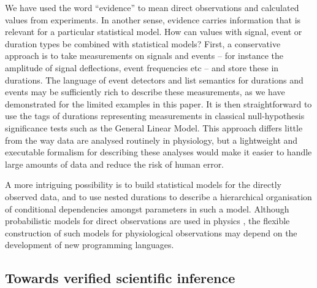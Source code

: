 We have used the word ``evidence'' to mean direct observations and
calculated values from experiments. In another sense, evidence carries
information that is relevant for a particular statistical model. How
can values with signal, event or duration types be combined with
statistical models? First, a conservative approach is to take
measurements on signals and events -- for instance the amplitude of
signal deflections, event frequencies etc -- and store these in
durations. The language of event detectors and list semantics for
durations and events may be sufficiently rich to describe these
measurements, as we have demonstrated for the limited examples in this
paper. It is then straightforward to use the tags of durations
representing measurements in classical null-hypothesis significance
tests such as the General Linear Model. This approach differs little
from the way data are analysed routinely in physiology, but a
lightweight and executable formalism for describing these analyses
would make it easier to handle large amounts of data and reduce the
risk of human error.

A more intriguing possibility is to build statistical models for the
directly observed data, and to use nested durations to describe a
hierarchical organisation of conditional dependencies amongst
parameters in such a model. Although probabilistic models for direct
observations are used in physics \citep{Daniell1991}, the flexible
construction of such models for physiological observations may depend
on the development of new programming languages.

\subsection*{Towards verified scientific inference}


